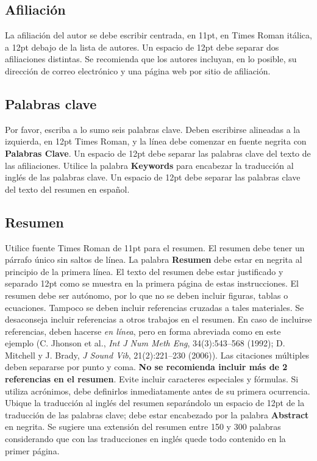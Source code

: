 \documentclass[oneside,a4paper,spanish,links]{amca}
\begin{document}
\subsection{Afiliación}

La afiliación del autor se debe escribir centrada, en 11pt, en
Times Roman itálica, a 12pt debajo de la lista de autores. Un
espacio de 12pt debe separar dos afiliaciones distintas. Se
recomienda que los autores incluyan, en lo posible, su dirección
de correo electrónico y una página web por sitio de afiliación.

\subsection{Palabras clave}

Por favor, escriba a lo sumo seis palabras clave. Deben escribirse
alineadas a la izquierda, en 12pt Times Roman, y la línea debe
comenzar en fuente negrita con {\bf Palabras Clave}. Un espacio de
12pt debe separar las palabras clave del texto de las
afiliaciones. Utilice la palabra {\bf Keywords} para encabezar la
traducción al inglés de las palabras clave. Un espacio de 12pt
debe separar las palabras clave del texto del resumen en español.

\subsection{Resumen}

Utilice fuente Times Roman de 11pt para el resumen. El resumen
debe tener un párrafo único sin saltos de línea. La palabra
\textbf{Resumen} debe estar en negrita al principio de la primera
línea. El texto del resumen debe estar justificado y separado 12pt
como se muestra en la primera página de estas instrucciones. El
resumen debe ser autónomo, por lo que no se deben incluir figuras,
tablas o ecuaciones. Tampoco se deben incluir referencias cruzadas
a tales materiales. Se desaconseja incluir referencias a otros
trabajos en el resumen. En caso de incluirse referencias, deben
hacerse \emph{en línea}, pero en forma abreviada como en este
ejemplo (C. Jhonson et al., \emph{Int J Num Meth Eng},
34(3):543--568 (1992); D. Mitchell y J. Brady, \emph{J Sound Vib},
21(2):221--230 (2006)). Las citaciones múltiples deben separarse
por punto y coma. \textbf{No se recomienda incluir más de 2
referencias en el resumen}. Evite incluir caracteres especiales y
fórmulas. Si utiliza acrónimos, debe definirlos inmediatamente
antes de su primera ocurrencia. Ubique la traducción al inglés del
resumen separándolo un espacio de 12pt de la traducción de las
palabras clave; debe estar encabezado por la palabra
\textbf{Abstract} en negrita. Se sugiere una extensión del resumen
entre 150 y 300 palabras considerando que con las traducciones en
inglés quede todo contenido en la primer página.
\end{document}
